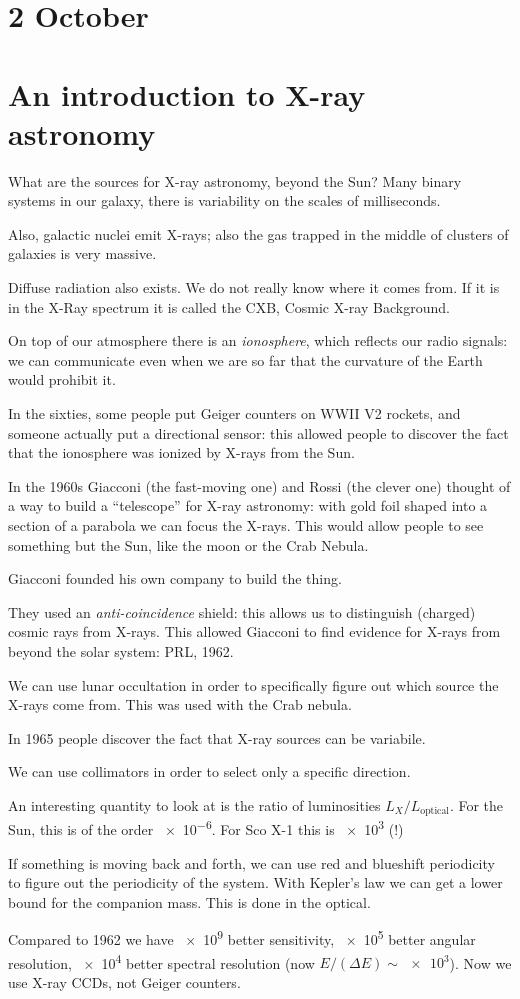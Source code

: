 \documentclass[main.tex]{subfiles}
\begin{document}
\section*{2 October}

\section{An introduction to X-ray astronomy}

What are the sources for X-ray astronomy, beyond the Sun? Many binary systems in our galaxy, there is variability on the scales of milliseconds.

Also, galactic nuclei emit X-rays; also the gas trapped in the middle of clusters of galaxies is very massive.

Diffuse radiation also exists. We do not really know where it comes from. If it is in the X-Ray spectrum it is called the CXB, Cosmic X-ray Background.

On top of our atmosphere there is an \emph{ionosphere}, which reflects our radio signals: we can communicate even when we are so far that the curvature of the Earth would prohibit it.

In the sixties, some people put Geiger counters on WWII V2 rockets, and someone actually put a directional sensor: this allowed people to discover the fact that the ionosphere was ionized by X-rays from the Sun.

In the 1960s Giacconi (the fast-moving one) and Rossi (the clever one) thought of a way to build a ``telescope'' for X-ray astronomy: with gold foil shaped into a section of a parabola we can focus the X-rays.
This would allow people to see something but the Sun, like the moon or the Crab Nebula.

Giacconi founded his own company to build the thing.

They used an \emph{anti-coincidence} shield: this allows us to distinguish (charged) cosmic rays from X-rays.
This allowed Giacconi to find evidence for X-rays from beyond the solar system: PRL, 1962.

We can use lunar occultation in order to specifically figure out which source the X-rays come from. This was used with the Crab nebula.

In 1965 people discover the fact that X-ray sources can  be variabile.

We can use collimators in order to select only a specific direction.

An interesting quantity to look at is the ratio of luminosities \(L_X / L_{\text{optical}}\). For the Sun, this is of the order \num{e-6}. For Sco X-1 this is \num{e3} (!)

If something is moving back and forth, we can use red and blueshift periodicity to figure out the periodicity of the system.
With Kepler's law we can get a lower bound for the companion mass.
This is done in the optical.

Compared to 1962 we have \num{e9} better sensitivity, \num{e5} better angular resolution, \num{e4} better spectral resolution (now \(E / (\Delta E ) \sim \num{e3} \)). Now we use X-ray CCDs, not Geiger counters.
\end{document}
